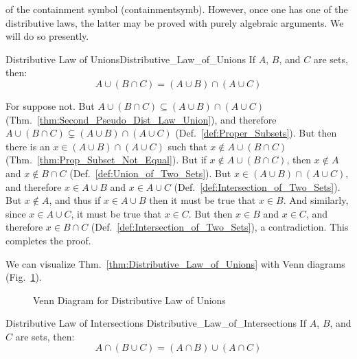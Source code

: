         of the containment symbol (\gls{containmentsymb}). However, once one has
        one of the distributive laws, the latter may be proved with purely
        algebraic arguments. We will do so presently.
        \newpage
        \begin{ftheorem}{Distributive Law of Unions}{Distributive_Law_of_Unions}
            If $A$, $B$, and $C$ are sets, then:
            \begin{equation*}
                A\cup(B\cap{C})=(A\cup{B})\cap(A\cup{C})
            \end{equation*}
        \end{ftheorem}
        \begin{bproof}
            For suppose not. But
            $A\cup(B\cap{C})\subseteq(A\cup{B})\cap(A\cup{C})$
            (Thm.~\ref{thm:Second_Pseudo_Dist_Law_Union}), and therefore
            $A\cup(B\cap{C})\subsetneq(A\cup{B})\cap(A\cup{C})$
            (Def.~\ref{def:Proper_Subsets}). But then there is an
            $x\in(A\cup{B})\cap(A\cup{C})$ such that $x\notin{A}\cup(B\cap{C})$
            (Thm.~\ref{thm:Prop_Subset_Not_Equal}). But if
            $x\notin{A}\cup(B\cap{C})$, then $x\notin{A}$ and
            $x\notin{B}\cap{C}$ (Def.~\ref{def:Union_of_Two_Sets}). But
            $x\in(A\cup{B})\cap(A\cup{C})$, and therefore $x\in{A}\cup{B}$ and
            $x\in{A}\cup{C}$ (Def.~\ref{def:Intersection_of_Two_Sets}). But
            $x\notin{A}$, and thus if $x\in{A}\cup{B}$ then it must be true
            that $x\in{B}$. And similarly, since $x\in{A}\cup{C}$, it must be
            true that $x\in{C}$. But then $x\in{B}$ and $x\in{C}$, and therefore
            $x\in{B}\cap{C}$ (Def.~\ref{def:Intersection_of_Two_Sets}), a
            contradiction. This completes the proof.
        \end{bproof}
        We can visualize Thm.~\ref{thm:Distributive_Law_of_Unions} with Venn
        diagrams
        (Fig.~\ref{fig:Venn_Diagram_Distributive_Law_of_Unions}).
        \begin{figure}[H]
            \centering
            \captionsetup{type=figure}
            
            \caption{Venn Diagram for Distributive Law of Unions}
            \label{fig:Venn_Diagram_Distributive_Law_of_Unions}
        \end{figure}
        \begin{ftheorem}{Distributive Law of Intersections}
                        {Distributive_Law_of_Intersections}
            If $A$, $B$, and $C$ are sets, then:
            \begin{equation*}
                A\cap(B\cup{C})=(A\cap{B})\cup(A\cap{C})
            \end{equation*}
        \end{ftheorem}

